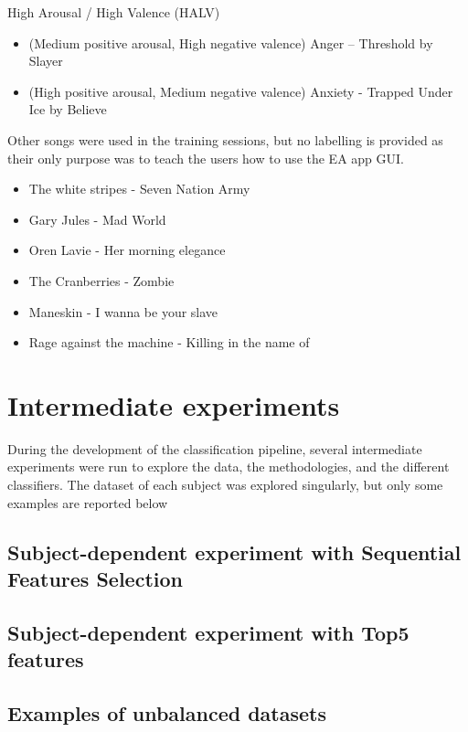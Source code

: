 High Arousal / High Valence (HALV)
\begin{itemize}
\item  (Medium positive arousal, High negative valence) Anger – Threshold by Slayer
\item  (High positive arousal, Medium negative valence) Anxiety - Trapped Under Ice by Believe
\end{itemize}

Other songs were used in the training sessions, but no labelling is provided as their only purpose was 
to teach the users how to use the EA app GUI.
\begin{itemize}
\item  The white stripes - Seven Nation Army
\item  Gary Jules - Mad World
\item  Oren Lavie - Her morning elegance
\item  The Cranberries - Zombie
\item  Maneskin - I wanna be your slave
\item  Rage against the machine - Killing in the name of
\end{itemize}



\section{Intermediate experiments}
\label{sec:appendix_A3}
During the development of the classification pipeline, several intermediate experiments were run to
explore the data, the methodologies, and the different classifiers. The dataset of each subject was 
explored singularly, but only some examples are reported below

\subsection{Subject-dependent experiment with Sequential Features Selection}
\label{sec:appendix_A3.1}

\subsection{Subject-dependent experiment with Top5 features}
\label{sec:appendix_A3.2}

\subsection{Examples of unbalanced datasets}
\label{sec:appendix_A3.3}

